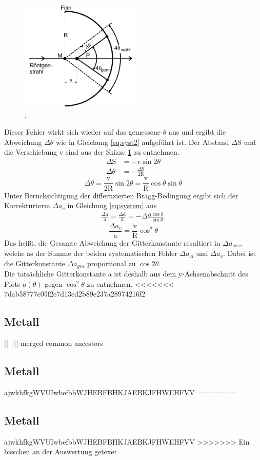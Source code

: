 \begin{figure}
\centering
	\includegraphics[width = 0.5\textwidth]{Abbildungen/Syst2.png}
	\caption{\cite{Anleitung}.}
	\label{fig:sys2}
\end{figure}
Dieser Fehler wirkt sich wieder auf das gemessene $\theta$ aus und ergibt die Abweichung $\Delta \theta$ wie in Gleichung \ref{eq:syst2} aufgeführt ist.
Der Abstand $\Delta$S und die Verschiebung v sind aus der Skizze \ref{fig:sys2} zu entnehmen.
\begin{align*}
\Delta \text{S} &  = -\text{v} \sin{2 \theta} \\
\Delta \theta & = -\frac{\Delta \text{S}}{2\text{R}}
\end{align*}
\begin{equation}
\Delta \theta = \frac{\text{v}}{2\text{R}}\sin{2\theta} = \frac{\text{v}}{\text{R}}\cos{\theta}\sin{\theta}
\label{eq:syst2}
\end{equation}
Unter Berücksichtigung der differnzierten Bragg-Bedingung ergibt sich der Korrekturterm $\Delta a_v$ in Gleichung \ref{eq:system} aus
\begin{align*}
\frac{\Delta \text{a}}{\text{a}} = \frac{\Delta \text{d}}{\text{d}} = -\Delta \theta \frac{\cos{\theta}}{\sin{\theta}}.
\end{align*}
\begin{equation}
\frac{\Delta a_v}{\text{a}} = \frac{\text{v}}{\text{R}}\cos^2{\theta}
\label{eq:system}
\end{equation}
Das heißt, die Gesamte Abweichung der Gitterkonstante resultiert in $\Delta a_{ges}$, welche as der Summe der beiden systematischen Fehler $\Delta a_A$ und $\Delta a_v$. 
Dabei ist die Gitterkonstante $\Delta a_{ges}$ proportional zu $\cos2{\theta}$.\\
Die tatsächliche Gitterkonstante a ist deshalb aus dem y-Achsenabschnitt des Plots $a(\theta)$ gegen $\cos^2{\theta}$ zu entnehmen.
<<<<<<< 7dab58777c05f2e7d13ed2b89e237a28974216f2
\subsection{Metall}
||||||| merged common ancestors
\subsection{Metall}

ajwkhfkgWVUIwbefbbWJHEBFBHKJAEBKJFHWEHFVV
=======

\subsection{Metall}

ajwkhfkgWVUIwbefbbWJHEBFBHKJAEBKJFHWEHFVV
>>>>>>> Ein bisschen an der Auswertung getexet
